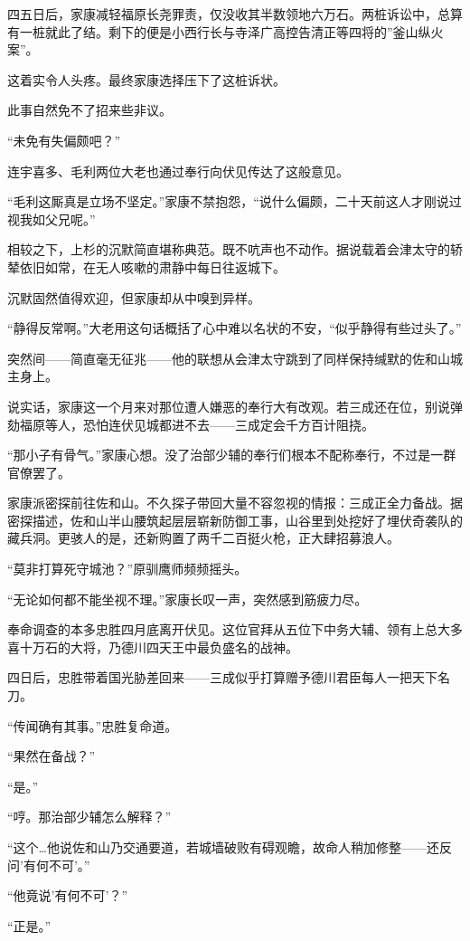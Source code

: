 \documentclass[
]{book}
\begin{document}
四五日后，家康减轻福原长尧罪责，仅没收其半数领地六万石。两桩诉讼中，总算有一桩就此了结。剩下的便是小西行长与寺泽广高控告清正等四将的''釜山纵火案''。

这着实令人头疼。最终家康选择压下了这桩诉状。

此事自然免不了招来些非议。

``未免有失偏颇吧？''

连宇喜多、毛利两位大老也通过奉行向伏见传达了这般意见。

``毛利这厮真是立场不坚定。''家康不禁抱怨，``说什么偏颇，二十天前这人才刚说过视我如父兄呢。''

相较之下，上杉的沉默简直堪称典范。既不吭声也不动作。据说载着会津太守的轿辇依旧如常，在无人咳嗽的肃静中每日往返城下。

沉默固然值得欢迎，但家康却从中嗅到异样。

``静得反常啊。''大老用这句话概括了心中难以名状的不安，``似乎静得有些过头了。''

突然间------简直毫无征兆------他的联想从会津太守跳到了同样保持缄默的佐和山城主身上。

说实话，家康这一个月来对那位遭人嫌恶的奉行大有改观。若三成还在位，别说弹劾福原等人，恐怕连伏见城都进不去------三成定会千方百计阻挠。

``那小子有骨气。''家康心想。没了治部少辅的奉行们根本不配称奉行，不过是一群官僚罢了。

家康派密探前往佐和山。不久探子带回大量不容忽视的情报：三成正全力备战。据密探描述，佐和山半山腰筑起层层崭新防御工事，山谷里到处挖好了埋伏奇袭队的藏兵洞。更骇人的是，还新购置了两千二百挺火枪，正大肆招募浪人。

``莫非打算死守城池？''原驯鹰师频频摇头。

``无论如何都不能坐视不理。''家康长叹一声，突然感到筋疲力尽。

奉命调查的本多忠胜四月底离开伏见。这位官拜从五位下中务大辅、领有上总大多喜十万石的大将，乃德川四天王中最负盛名的战神。

四日后，忠胜带着国光胁差回来------三成似乎打算赠予德川君臣每人一把天下名刀。

``传闻确有其事。''忠胜复命道。

``果然在备战？''

``是。''

``哼。那治部少辅怎么解释？''

``这个\ldots 他说佐和山乃交通要道，若城墙破败有碍观瞻，故命人稍加修整------还反问'有何不可'。''

``他竟说'有何不可'？''

``正是。''
\end{document}
